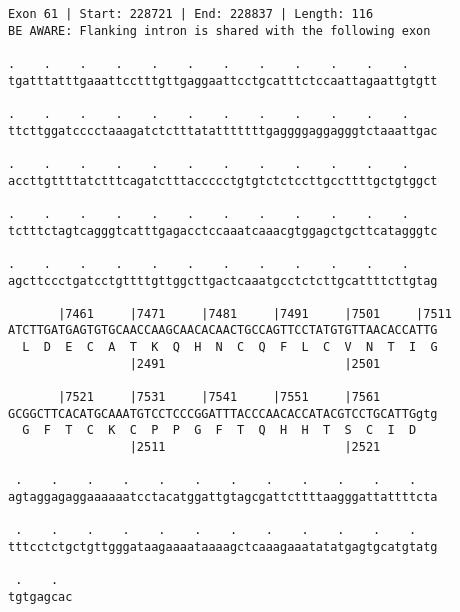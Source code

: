 \documentclass{article}
\begin{document}
\begin{Verbatim}[fontfamily=courier]
Exon 61 | Start: 228721 | End: 228837 | Length: 116
BE AWARE: Flanking intron is shared with the following exon

.    .    .    .    .    .    .    .    .    .    .    .    
tgatttatttgaaattcctttgttgaggaattcctgcatttctccaattagaattgtgtt

.    .    .    .    .    .    .    .    .    .    .    .    
ttcttggatcccctaaagatctctttatatttttttgaggggaggagggtctaaattgac

.    .    .    .    .    .    .    .    .    .    .    .    
accttgttttatctttcagatctttaccccctgtgtctctccttgccttttgctgtggct

.    .    .    .    .    .    .    .    .    .    .    .    
tctttctagtcagggtcatttgagacctccaaatcaaacgtggagctgcttcatagggtc

.    .    .    .    .    .    .    .    .    .    .    .    
agcttccctgatcctgttttgttggcttgactcaaatgcctctcttgcattttcttgtag

       |7461     |7471     |7481     |7491     |7501     |7511
ATCTTGATGAGTGTGCAACCAAGCAACACAACTGCCAGTTCCTATGTGTTAACACCATTG
  L  D  E  C  A  T  K  Q  H  N  C  Q  F  L  C  V  N  T  I  G
                 |2491                         |2501        

       |7521     |7531     |7541     |7551     |7561        
GCGGCTTCACATGCAAATGTCCTCCCGGATTTACCCAACACCATACGTCCTGCATTGgtg
  G  F  T  C  K  C  P  P  G  F  T  Q  H  H  T  S  C  I  D   
                 |2511                         |2521        

 .    .    .    .    .    .    .    .    .    .    .    .   
agtaggagaggaaaaaatcctacatggattgtagcgattcttttaagggattattttcta

 .    .    .    .    .    .    .    .    .    .    .    .   
tttcctctgctgttgggataagaaaataaaagctcaaagaaatatatgagtgcatgtatg

 .    .  
tgtgagcac
\end{Verbatim}
\newpage
\end{document}
